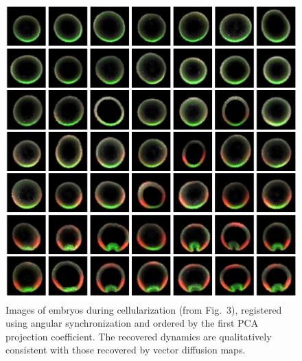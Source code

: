 \documentclass{pnastwo}
\newcommand{\fig}[0]{Fig.}
\begin{document}
\begin{figure}
\includegraphics{figS7}
\caption{Images of embryos during cellularization (from \fig~3), registered using angular synchronization \cite{singer2011angular} and ordered by the first PCA projection coefficient. The recovered dynamics are qualitatively consistent with those recovered by vector diffusion maps. }
\label{fig:PCA_data1}
\end{figure}
\end{document}
